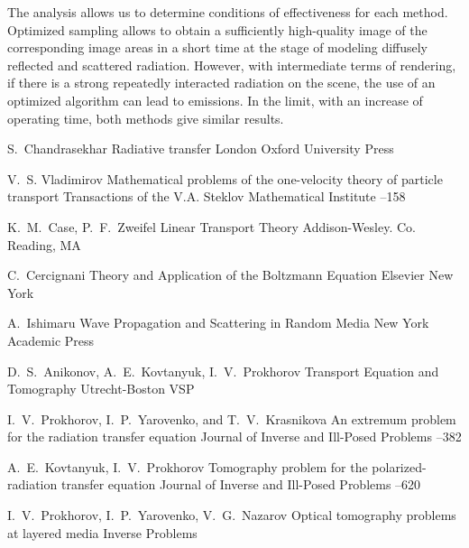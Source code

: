 \documentclass[12pt,reqno]{report}
\begin{document}
{The analysis allows us to determine conditions of effectiveness for each method. 
Optimized sampling allows to obtain a sufficiently high-quality image of the corresponding image areas in a short time 
at the stage of modeling diffusely reflected and scattered radiation. 
However, with intermediate terms of rendering, if there is a strong repeatedly interacted radiation 
on the scene, the use of an optimized algorithm can lead to emissions.
In the limit, with an increase of operating time, both methods give similar results.



\begin{thebibliography}{1}

 \by  S.~Chandrasekhar \book  Radiative transfer \publaddr London \publ Oxford University Press 

 \by V.~S. Vladimirov  \paper Mathematical problems of the one-velocity theory of particle transport \jour  Transactions of the V.A. Steklov Mathematical Institute  
 --158


 \by K.~M.~Case, P.~F.~Zweifel \book Linear Transport Theory \publ 
Addison-Wesley. Co. Reading, MA 


 \by C.~Cercignani \book Theory and Application of the Boltzmann Equation \publ Elsevier \publaddr New York 

 \by  A.~Ishimaru \book  Wave Propagation and Scattering in 	Random Media \publaddr  New York \publ Academic Press 

 \by    D.~S.~Anikonov,   A.~E.~Kovtanyuk,    I.~V.~Prokhorov \book Transport
	Equation and Tomography \publaddr Utrecht-Boston \publ  VSP 

 \by   I.~V.~Prokhorov,   I.~P.~Yarovenko, and T.~V.~Krasnikova \paper An extremum problem for the radiation transfer
equation \jour Journal of Inverse and Ill-Posed Problems 
  --382

 \by A.~E.~Kovtanyuk, I.~V.~Prokhorov \paper Tomography problem for
the polarized-radiation transfer equation \jour  Journal of Inverse and Ill-Posed Problems    --620


\by I.~V.~Prokhorov, I.~P.~Yarovenko, V.~G.~Nazarov
\paper Optical tomography problems at layered media
\jour Inverse Problems


\end{thebibliography}}
\end{document}
